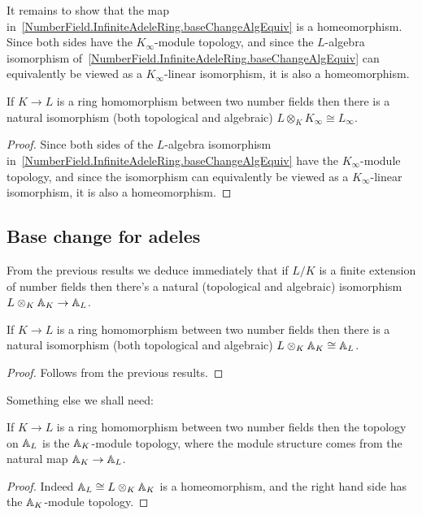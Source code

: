 It remains to show that the map in~\ref{NumberField.InfiniteAdeleRing.baseChangeAlgEquiv} is a
homeomorphism.
Since both sides have the $K_{\infty}$-module topology, and since the $L$-algebra isomorphism
of~\ref{NumberField.InfiniteAdeleRing.baseChangeAlgEquiv} can equivalently be viewed as a
$K_{\infty}$-linear isomorphism, it is also a homeomorphism.

\begin{theorem}
  \label{NumberField.InfiniteAdeleRing.baseChangeEquiv}
  \leanok
  If $K\to L$ is a ring homomorphism between two number fields then there is a natural isomorphism
  (both topological and algebraic) $L\otimes_KK_\infty\cong L_\infty$.
\end{theorem}
\begin{proof}
  Since both sides of the $L$-algebra isomorphism
  in~\ref{NumberField.InfiniteAdeleRing.baseChangeAlgEquiv} have the $K_{\infty}$-module topology,
  and since the isomorphism can equivalently be viewed as a $K_{\infty}$-linear isomorphism,
  it is also a homeomorphism.
\end{proof}


\subsection{Base change for adeles}

From the previous results we deduce immediately that if $L/K$ is a finite extension
of number fields then there's a natural (topological and algebraic) isomorphism
$L\otimes_K\mathbb{A}_K\to \mathbb{A}_L$.

\begin{theorem}
  \label{NumberField.AdeleRing.baseChangeEquiv}
  \leanok
  If $K\to L$ is a ring homomorphism between two number fields then there is a natural isomorphism
  (both topological and algebraic) $L\otimes_K\mathbb{A}_K\cong\mathbb{A}_L$.
\end{theorem}
\begin{proof}
  \leanok
  Follows from the previous results.
\end{proof}

Something else we shall need:

\begin{theorem}
  \label{NumberField.AdeleRing.baseChange_moduleTopology}
  \leanok
  If $K\to L$ is a ring homomorphism between two number fields then the topology on $\mathbb{A}_L$
  is the $\mathbb{A}_K$-module topology, where the module structure comes from the
  natural map $\mathbb{A}_K\to\mathbb{A}_L$.
\end{theorem}
\begin{proof}
  \leanok
  Indeed $\mathbb{A}_L\cong L\otimes_K\mathbb{A}_K$ is a homeomorphism, and
  the right hand side has the $\mathbb{A}_K$-module topology.
\end{proof}

